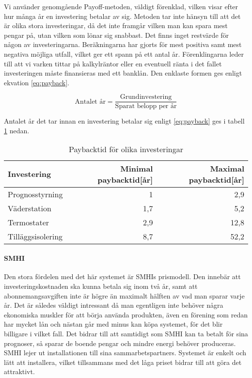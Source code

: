 Vi använder genomgående Payoff-metoden, väldigt förenklad, vilken visar efter hur många år en investering betalar av sig. Metoden tar inte hänsyn till att det är olika stora investeringar, då det inte framgår vilken man kan spara mest pengar på, utan vilken som lönar sig snabbast. Det finns inget restvärde för någon av investeringarna. Beräkningarna har gjorts för mest positiva samt mest negativa möjliga utfall, vilket ger ett spann på ett antal år. Förenklingarna leder till att vi varken tittar på kalkylräntor eller en eventuell ränta i det fallet investeringen måste finansieras med ett banklån. Den enklaste formen ges enligt ekvation \eqref{eq:payback}. \cite{ind.ek}

\begin{equation} \label{eq:payback}
\text{Antalet år}=\frac{\text{Grundinvestering}}{\text{Sparat belopp per år}}
\end{equation}

Antalet år det tar innan en investering betalar sig enligt \eqref{eq:payback} ges i tabell \ref{tbl:payback} nedan.

\begin{table}[hbtp]
\centering
\caption{Paybacktid för olika investeringar}
\label{tbl:payback}

\begin{tabular}
{|l|r|r|}
\hline
\textbf{Investering} & \textbf{Minimal paybacktid[år]} &{\textbf{Maximal paybacktid[år]}} \\
\hline
Prognosstyrning &  1 & 2,9 \\ 
\hline
Väderstation & 1,7 & 5,2 \\
\hline
Termostater & 2,9 & 12,8 \\
\hline
Tilläggsisolering & 8,7 & 52,2 \\
\hline
\end{tabular}
\end{table}

\paragraph{SMHI}
Den stora fördelen med det här systemet är SMHIs prismodell. Den innebär att investeringskostnaden ska kunna betala sig inom två år, samt att abonnemangsavgiften inte är högre än maximalt hälften av vad man sparar varje år. Det är således väldigt intressant då man egentligen inte behöver några ekonomiska muskler för att börja använda produkten, även en förening som redan har mycket lån och nästan går med minus kan köpa systemet, för det blir billigare i vilket fall. Det bidrar till att samtidigt som SMHI kan ta betalt för sina prognoser, så sparar de boende pengar och mindre energi behöver produceras. SMHI lejer ut installationen till sina sammarbetspartners. Systemet är enkelt och lätt att installera, vilket tillsammans med det låga priset bidrar till att göra det attraktivt.


